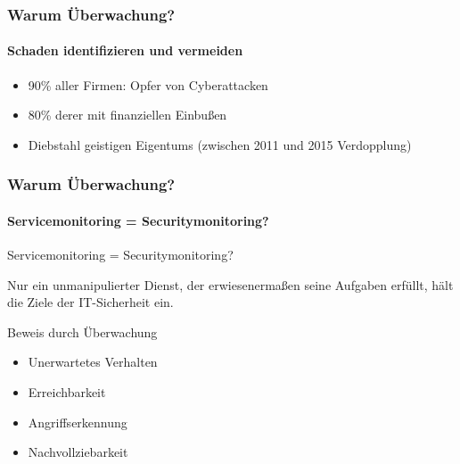 \documentclass[10pt]{beamer} %
\begin{document}
\begin{frame}
\frametitle{Warum Überwachung?}
\framesubtitle{Schaden identifizieren und vermeiden}

    \begin{itemize}
        \item 90\% aller Firmen: Opfer von Cyberattacken
        \item 80\% derer mit finanziellen Einbußen
        \item Diebstahl geistigen Eigentums (zwischen 2011 und 2015 Verdopplung) 
    \end{itemize}

\end{frame}

\begin{frame}
    \frametitle{Warum Überwachung?}
        \framesubtitle{Servicemonitoring = Securitymonitoring?}
        
        \begin{alertblock}{\centering Servicemonitoring = Securitymonitoring?}
            \vspace{0.3cm}
            \vspace{0.3cm}
            
            Nur ein unmanipulierter Dienst, der erwiesenermaßen seine
            Aufgaben erfüllt, hält die Ziele der IT-Sicherheit ein.\\
            \vspace{0.3cm}
        \end{alertblock}     
    
        \pause
           
        \begin{alertblock}{Beweis durch Überwachung}
             \begin{itemize}
                 \item Unerwartetes Verhalten
                 \item Erreichbarkeit
                 \item Angriffserkennung
                 \item Nachvollziebarkeit
             \end{itemize}
        \end{alertblock}
    

\end{frame}

\end{document}
